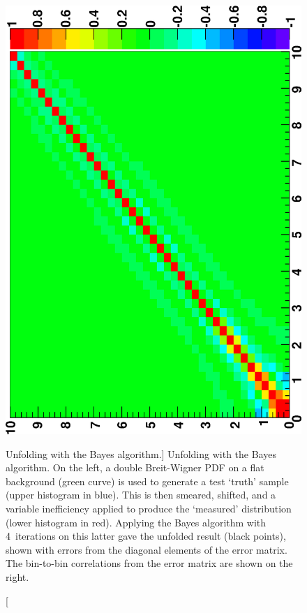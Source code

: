 \documentclass{cernrep}
\begin{document}
\begin{figure}
{                     \includegraphics[angle=-90,width=.338\textwidth,clip]{phystat2011_adye_bayes2.eps}}%
\caption
[Unfolding with the Bayes algorithm.]%
{Unfolding with the Bayes algorithm.
On the left, a double Breit-Wigner PDF on a flat background (green curve) is used to generate
a test `truth' sample (upper histogram in blue).
This is then smeared, shifted, and a variable inefficiency applied to produce
the `measured' distribution (lower histogram in red).
Applying the Bayes algorithm with 4~iterations on this latter gave the unfolded result
(black points), shown with errors from the diagonal elements of the error matrix.
The bin-to-bin correlations from the error matrix are shown on the right.}%
\label{Fig:adye:bayes-example}%
\end{figure}%
\end{document}

